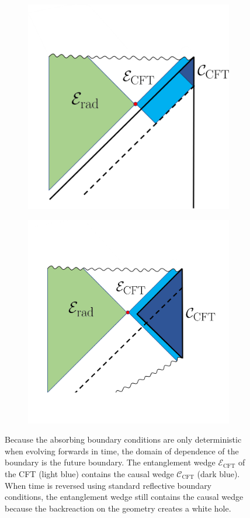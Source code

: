 \documentclass[12pt]{article}
\begin{document}
\begin{figure} [t]
\vspace{-1.2cm}
\centering
\begin{subfigure}{.48\textwidth}
\vspace{-0.6cm}
  \centering
 \includegraphics[width = 0.8\linewidth]{BH_Penrose_Full.png}
\end{subfigure}
\begin{subfigure}{.48\textwidth}
 \includegraphics[width = 0.9\linewidth]{BH_Penrose_FixedBCs.png}
 \centering
\end{subfigure}
\caption{Because the absorbing boundary conditions are only deterministic when evolving forwards in time, the domain of dependence of the boundary is the future boundary. The entanglement wedge $\mathcal{E}_\text{CFT}$ of the CFT (light blue) contains the causal wedge $\mathcal{C}_\text{CFT}$ (dark blue). When time is reversed using standard reflective boundary conditions, the entanglement wedge still contains the causal wedge because the backreaction on the geometry creates a white hole.}
\label{fig:bh_penrose}
\end{figure}
\end{document}
